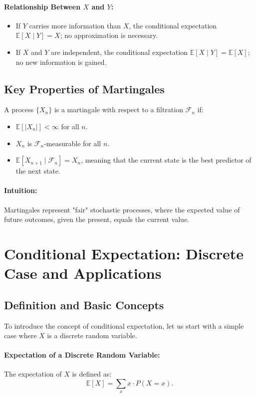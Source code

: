 \paragraph{Relationship Between \( X \) and \( Y \):}
\begin{itemize}
    \item If \( Y \) carries more information than \( X \), the conditional expectation \( \mathbb{E}[X \mid Y] = X \); no approximation is necessary.
    \item If \( X \) and \( Y \) are independent, the conditional expectation \( \mathbb{E}[X \mid Y] = \mathbb{E}[X] \); no new information is gained.
\end{itemize}

\subsection{Key Properties of Martingales}
A process \( \{X_n\} \) is a martingale with respect to a filtration \( \mathcal{F}_n \) if:
\begin{itemize}
    \item \( \mathbb{E}[|X_n|] < \infty \) for all \( n \).
    \item \( X_n \) is \( \mathcal{F}_n \)-measurable for all \( n \).
    \item \( \mathbb{E}[X_{n+1} \mid \mathcal{F}_n] = X_n \), meaning that the current state is the best predictor of the next state.
\end{itemize}

\paragraph{Intuition:}
Martingales represent "fair" stochastic processes, where the expected value of future outcomes, given the present, equals the current value.


\section{Conditional Expectation: Discrete Case and Applications}

\subsection{Definition and Basic Concepts}
To introduce the concept of conditional expectation, let us start with a simple case where \(X\) is a discrete random variable. 

\paragraph{Expectation of a Discrete Random Variable:}
The expectation of \(X\) is defined as:
\[
\mathbb{E}[X] = \sum_x x \cdot P(X = x).
\]

